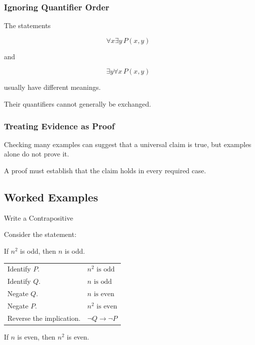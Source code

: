 \subsubsection{Ignoring Quantifier Order}
\label{subsec:error-quantifier-order}

The statements

\[ \forall x\exists y\,P(x,y) \]

and

\[ \exists y\forall x\,P(x,y) \]

usually have different meanings.

Their quantifiers cannot generally be exchanged.

\subsubsection{Treating Evidence as Proof}
\label{subsec:error-evidence-proof}

Checking many examples can suggest that a universal claim is true, but examples
alone do not prove it.

A proof must establish that the claim holds in every required case.

\subsection{Worked Examples}
\label{subsec:logic-worked-examples}

\begin{workedexamplebox}{Write a Contrapositive}

Consider the statement:

\begin{center}
If \(n^2\) is odd, then \(n\) is odd.
\end{center}

\begin{tabularx}{\textwidth}{@{}>{\raggedright\arraybackslash}p{}X@{}}
Identify \(P\). & \(n^2\text{ is odd}\)\\
Identify \(Q\). & \(n\text{ is odd}\)\\
Negate \(Q\). & \(n\text{ is even}\)\\
Negate \(P\). & \(n^2\text{ is even}\)\\
Reverse the implication. & \(\neg Q\to\neg P\)
\end{tabularx}

\begin{answerbox}
If \(n\) is even, then \(n^2\) is even.
\end{answerbox}
\end{workedexamplebox}

